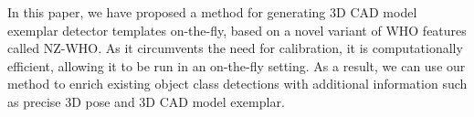 In this paper, we have proposed a method for generating 3D CAD model
exemplar detector templates on-the-fly, based on a novel variant of
WHO features called NZ-WHO. As it circumvents the need for
calibration, it is computationally efficient, allowing it to be run in
an on-the-fly setting. As a result, we can use our method to enrich
existing object class detections with additional information such as
precise 3D pose and 3D CAD model exemplar.
